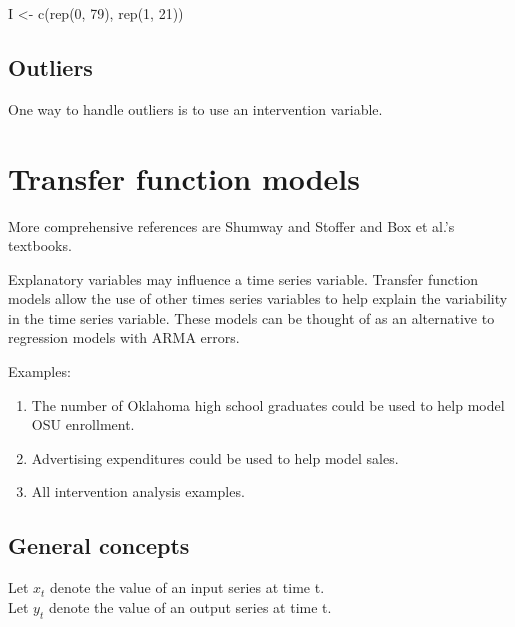 \documentclass[
]{book}
\newenvironment{Shaded}{\begin{snugshade}}{\end{snugshade}}
\newcommand{\DecValTok}[1]{\textcolor[rgb]{0.00,0.00,0.81}{#1}}
\newcommand{\FunctionTok}[1]{\textcolor[rgb]{0.00,0.00,0.00}{#1}}
\newcommand{\NormalTok}[1]{#1}
\newcommand{\OtherTok}[1]{\textcolor[rgb]{0.56,0.35,0.01}{#1}}
\providecommand{\tightlist}{%
  \setlength{\itemsep}{0pt}\setlength{\parskip}{0pt}}
\theoremstyle{definition}
\theoremstyle{definition}
\theoremstyle{definition}
\theoremstyle{definition}
\theoremstyle{remark}
\begin{document}
\begin{Shaded}
\begin{Highlighting}[]
\NormalTok{I }\OtherTok{\textless{}{-}} \FunctionTok{c}\NormalTok{(}\FunctionTok{rep}\NormalTok{(}\DecValTok{0}\NormalTok{, }\DecValTok{79}\NormalTok{), }\FunctionTok{rep}\NormalTok{(}\DecValTok{1}\NormalTok{, }\DecValTok{21}\NormalTok{))}
\end{Highlighting}
\end{Shaded}

\hypertarget{outliers}{%
\subsection{Outliers}\label{outliers}}

One way to handle outliers is to use an intervention variable.

\hypertarget{transfer-function-models}{%
\section{Transfer function models}\label{transfer-function-models}}

More comprehensive references are Shumway and Stoffer and Box et al.'s textbooks.

Explanatory variables may influence a time series variable. Transfer function models allow the use of other times series variables to help explain the variability in the time series variable. These models can be thought of as an alternative to regression models with ARMA errors.

Examples:

\begin{enumerate}
\def\labelenumi{\arabic{enumi}.}
\tightlist
\item
  The number of Oklahoma high school graduates could be used to help model OSU enrollment.\\
\item
  Advertising expenditures could be used to help model sales.
\item
  All intervention analysis examples.
\end{enumerate}

\hypertarget{general-concepts}{%
\subsection{General concepts}\label{general-concepts}}

Let \(x_t\) denote the value of an input series at time t.\\
Let \(y_t\) denote the value of an output series at time t.
\end{document}
